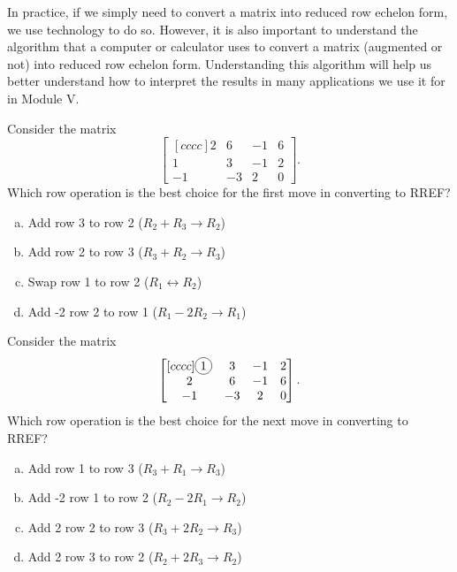 \begin{remark}
In practice, if we simply need to convert a matrix into reduced row echelon form, 
we use technology to do so.
\vfill
However, it is also important to understand the  algorithm
that a computer or calculator uses to convert a matrix (augmented or not) into reduced row echelon form.
Understanding this algorithm will help us better understand how to interpret the results
in many applications we use it for in Module V.
\end{remark}

\begin{activity}{8}
Consider the matrix
\[\begin{bmatrix}[cccc]2 & 6 & -1 & 6  \\ 1 & 3 & -1 & 2 \\ -1 & -3 & 2 & 0 \end{bmatrix}.\]
Which row operation is the best choice for the first move in converting to RREF?
\begin{enumerate}[(a)]
\item Add row 3 to row 2 (\(R_2+R_3 \rightarrow R_2\))
\item Add row 2 to row 3 (\(R_3+R_2 \rightarrow R_3\))
\item Swap row 1 to row 2 (\(R_1 \leftrightarrow R_2\))
\item Add -2 row 2 to row 1 (\(R_1-2R_2 \rightarrow R_1\))
\end{enumerate}
\end{activity}

\begin{activity}{7}
Consider the matrix
\[\begin{bmatrix}[cccc] \circledNumber{1} & 3 & -1 & 2 \\ 2 & 6 & -1 & 6 \\ -1 & -3 & 2 & 0 \end{bmatrix}.\]
Which row operation is the best choice for the next move in converting to RREF?
\begin{enumerate}[(a)]
\item Add row 1 to  row 3 (\(R_3+R_1 \rightarrow R_3\))
\item Add -2 row 1 to  row 2 (\(R_2-2R_1 \rightarrow R_2\))
\item Add 2 row 2 to row 3 (\(R_3+2R_2 \rightarrow R_3\))
\item Add 2 row 3 to row 2 (\(R_2+2R_3 \rightarrow R_2\))
\end{enumerate}
\end{activity}

